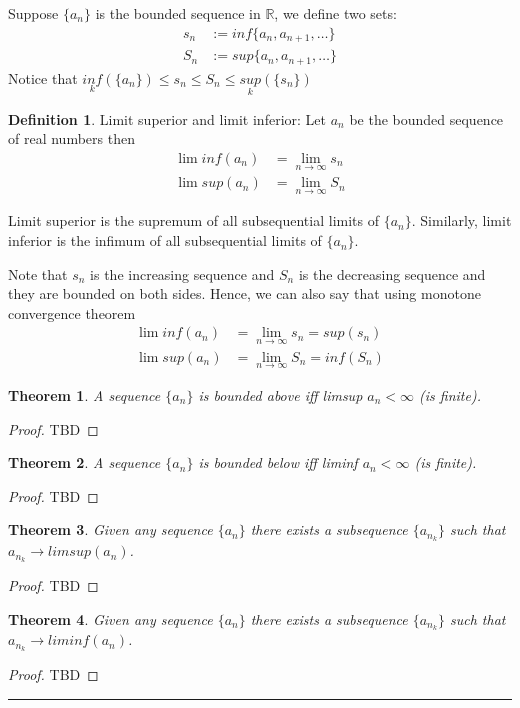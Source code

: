 \documentclass[12pt]{report}
\newtheorem{thm}{Theorem}
\theoremstyle{definition}
\newtheorem{defn}{Definition}
\begin{document}
Suppose $\{a_n\}$ is the bounded sequence in $\mathbb{R}$, we define two sets: 
\begin{align*}
    s_n &:= inf\{a_n, a_{n+1}, \dots \}\\
    S_n &:= sup\{a_n, a_{n+1}, \dots \}
\end{align*}
Notice that $ \underset{k}{inf}(\{a_n\}) \leq s_n \leq S_n \leq \underset{k}{sup}(\{s_n\})$
\begin{defn}
    Limit superior and limit inferior: Let $a_n$ be the bounded sequence of real numbers then
    \begin{align*}
        \lim inf(a_n) &= \lim_{n\to \infty} s_n\\
        \lim sup(a_n) &= \lim_{n\to \infty} S_n
    \end{align*}
\end{defn}
Limit superior is the supremum of all subsequential limits of $\{a_n\}$. Similarly, limit inferior is the infimum of all subsequential limits of $\{a_n\}$.

Note that $s_n$ is the increasing sequence and $S_n$ is the decreasing sequence and they are bounded on both sides. Hence, we can also say that using monotone convergence theorem
\begin{align*}
    \lim inf(a_n) &= \lim_{n\to \infty} s_n = sup(s_n)\\
    \lim sup(a_n) &= \lim_{n\to \infty} S_n = inf(S_n)
\end{align*}
\begin{thm}
    A sequence $\{a_n\}$ is bounded above iff limsup $a_n < \infty$ (is finite).
\end{thm}
\begin{proof}
    TBD
\end{proof}
\begin{thm}
    A sequence $\{a_n\}$ is bounded below iff liminf $a_n < \infty$ (is finite).
\end{thm}
\begin{proof}
    TBD
\end{proof}
\begin{thm}
    Given any sequence $\{a_n\}$ there exists a subsequence $\{a_{n_k}\}$ such that $a_{n_k} \to limsup(a_n)$.
\end{thm}
\begin{proof}
    TBD
\end{proof}
\begin{thm}
    Given any sequence $\{a_n\}$ there exists a subsequence $\{a_{n_k}\}$ such that $a_{n_k} \to liminf(a_n)$.
\end{thm}
\begin{proof}
    TBD
\end{proof}
\hrule
\end{document}
